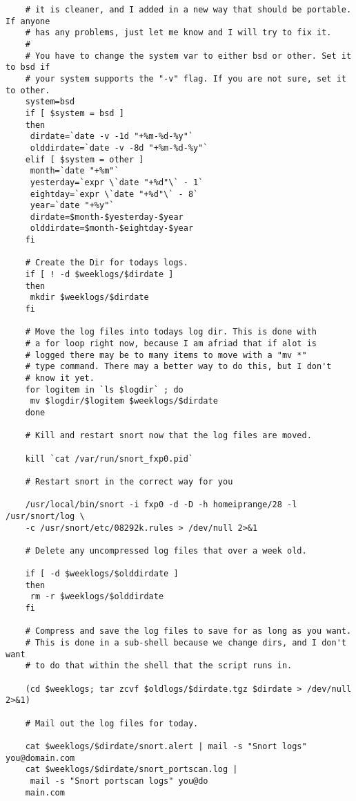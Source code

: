 \documentclass{article}
\begin{document}
\begin{verbatim}
    # it is cleaner, and I added in a new way that should be portable. If anyone
    # has any problems, just let me know and I will try to fix it.
    #
    # You have to change the system var to either bsd or other. Set it to bsd if
    # your system supports the "-v" flag. If you are not sure, set it to other.
    system=bsd
    if [ $system = bsd ]
    then
     dirdate=`date -v -1d "+%m-%d-%y"`
     olddirdate=`date -v -8d "+%m-%d-%y"`
    elif [ $system = other ]
     month=`date "+%m"`
     yesterday=`expr \`date "+%d"\` - 1`
     eightday=`expr \`date "+%d"\` - 8`
     year=`date "+%y"`
     dirdate=$month-$yesterday-$year
     olddirdate=$month-$eightday-$year
    fi
    
    # Create the Dir for todays logs.
    if [ ! -d $weeklogs/$dirdate ]
    then
     mkdir $weeklogs/$dirdate
    fi
    
    # Move the log files into todays log dir. This is done with
    # a for loop right now, because I am afriad that if alot is
    # logged there may be to many items to move with a "mv *"
    # type command. There may a better way to do this, but I don't
    # know it yet.
    for logitem in `ls $logdir` ; do
     mv $logdir/$logitem $weeklogs/$dirdate
    done
    
    # Kill and restart snort now that the log files are moved.
 
    kill `cat /var/run/snort_fxp0.pid`
    
    # Restart snort in the correct way for you
 
    /usr/local/bin/snort -i fxp0 -d -D -h homeiprange/28 -l /usr/snort/log \
    -c /usr/snort/etc/08292k.rules > /dev/null 2>&1

    # Delete any uncompressed log files that over a week old.
 
    if [ -d $weeklogs/$olddirdate ]
    then
     rm -r $weeklogs/$olddirdate
    fi

    # Compress and save the log files to save for as long as you want.
    # This is done in a sub-shell because we change dirs, and I don't want 
    # to do that within the shell that the script runs in.

    (cd $weeklogs; tar zcvf $oldlogs/$dirdate.tgz $dirdate > /dev/null 2>&1)

    # Mail out the log files for today.

    cat $weeklogs/$dirdate/snort.alert | mail -s "Snort logs" you@domain.com
    cat $weeklogs/$dirdate/snort_portscan.log |
     mail -s "Snort portscan logs" you@do
    main.com
    \end{verbatim}
\end{document}

